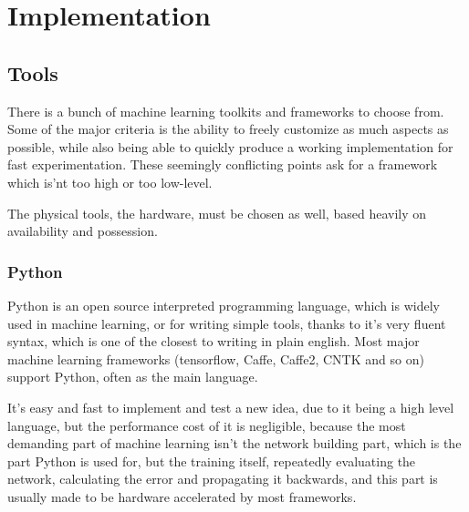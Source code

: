 \documentclass[a4paper,12pt]{article}
\begin{document}
\section{Implementation}
\subsection{Tools}
There is a bunch of machine learning toolkits and frameworks to choose from. Some of the major criteria is the ability to freely customize as much aspects as possible, while also being able to quickly produce a working implementation for fast experimentation. These seemingly conflicting points ask for a framework which is'nt too high or too low-level.\par
The physical tools, the hardware, must be chosen as well, based heavily on availability and possession.
\subsubsection{Python}
Python is an open source interpreted programming language, which is widely used in machine learning, or for writing simple tools, thanks to it's very fluent syntax, which is one of the closest to writing in plain english. Most major machine learning frameworks (tensorflow, Caffe, Caffe2, CNTK and so on) support Python, often as the main language.\par
It's easy and fast to implement and test a new idea, due to it being a high level language, but the performance cost of it is negligible, because the most demanding part of machine learning isn't the network building part, which is the part Python is used for, but the training itself, repeatedly evaluating the network, calculating the error and propagating it backwards, and this part is usually made to be hardware accelerated by most frameworks.
\end{document}
